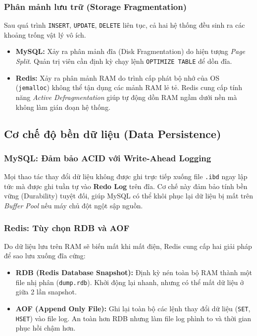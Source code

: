 \subsubsection{Phân mảnh lưu trữ (Storage Fragmentation)}
Sau quá trình \texttt{INSERT}, \texttt{UPDATE}, \texttt{DELETE} liên tục, cả hai hệ thống đều sinh ra các khoảng trống vật lý vô ích.

\begin{itemize}
    \item \textbf{MySQL:} Xảy ra phân mảnh đĩa (Disk Fragmentation) do hiện tượng \textit{Page Split}. Quản trị viên cần định kỳ chạy lệnh \texttt{OPTIMIZE TABLE} để dồn đĩa.
    \item \textbf{Redis:} Xảy ra phân mảnh RAM do trình cấp phát bộ nhớ của OS (\texttt{jemalloc}) không thể tận dụng các mảnh RAM lẻ tẻ. Redis cung cấp tính năng \textit{Active Defragmentation} giúp tự động dồn RAM ngầm dưới nền mà không làm gián đoạn hệ thống.
\end{itemize}


\subsection{Cơ chế độ bền dữ liệu (Data Persistence)}

\subsubsection{MySQL: Đảm bảo ACID với Write-Ahead Logging}
Mọi thao tác thay đổi dữ liệu không được ghi trực tiếp xuống file \texttt{.ibd} ngay lập tức mà được ghi tuần tự vào \textbf{Redo Log} trên đĩa. Cơ chế này đảm bảo tính bền vững (Durability) tuyệt đối, giúp MySQL có thể khôi phục lại dữ liệu bị mất trên \textit{Buffer Pool} nếu máy chủ đột ngột sập nguồn.

\subsubsection{Redis: Tùy chọn RDB và AOF}
Do dữ liệu lưu trên RAM sẽ biến mất khi mất điện, Redis cung cấp hai giải pháp để sao lưu xuống đĩa cứng:
\begin{itemize}
    \item \textbf{RDB (Redis Database Snapshot):} Định kỳ nén toàn bộ RAM thành một file nhị phân (\texttt{dump.rdb}). Khởi động lại nhanh, nhưng có thể mất dữ liệu ở giữa 2 lần snapshot.
    \item \textbf{AOF (Append Only File):} Ghi lại toàn bộ các lệnh thay đổi dữ liệu (\texttt{SET}, \texttt{HSET}) vào file log. An toàn hơn RDB nhưng làm file log phình to và thời gian phục hồi chậm hơn.
\end{itemize}


